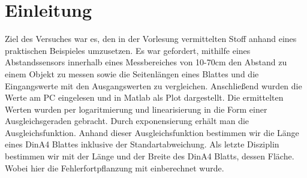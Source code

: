 \documentclass[TGAI_Laborbericht.tex]{subfiles}
\begin{document}
\chapter{Einleitung}
\label{chap:EINL}
\pagestyle{plain}
Ziel des Versuches war es, den in der Vorlesung vermittelten Stoff anhand eines praktischen
Beispieles umzusetzen. Es war gefordert, mithilfe eines Abstandssensors innerhalb eines
Messbereiches von 10-70cm den Abstand zu einem Objekt zu messen sowie die
Seitenlängen eines Blattes und die Eingangswerte mit den Ausgangswerten zu vergleichen.
Anschließend wurden die Werte am PC eingelesen und in Matlab als Plot dargestellt. Die
ermittelten Werten wurden per logaritmierung und linearisierung in die Form einer
Ausgleichsgeraden gebracht. Durch exponensierung erhält man die Ausgleichsfunktion.
Anhand dieser Ausgleichsfunktion bestimmen wir die Länge eines DinA4 Blattes inklusive
der Standartabweichung. Als letzte Disziplin bestimmen wir mit der Länge und der Breite
des DinA4 Blatts, dessen Fläche. Wobei hier die Fehlerfortpflanzung mit einberechnet
wurde.
\end{document}
